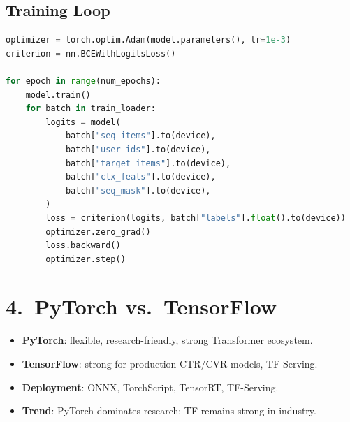 \documentclass[12pt]{article}
\begin{document}
\subsection*{Training Loop}
\begin{lstlisting}[language=Python]
optimizer = torch.optim.Adam(model.parameters(), lr=1e-3)
criterion = nn.BCEWithLogitsLoss()

for epoch in range(num_epochs):
    model.train()
    for batch in train_loader:
        logits = model(
            batch["seq_items"].to(device),
            batch["user_ids"].to(device),
            batch["target_items"].to(device),
            batch["ctx_feats"].to(device),
            batch["seq_mask"].to(device),
        )
        loss = criterion(logits, batch["labels"].float().to(device))
        optimizer.zero_grad()
        loss.backward()
        optimizer.step()
\end{lstlisting}

\section{4.\ PyTorch vs.\ TensorFlow}
\begin{itemize}
    \item \textbf{PyTorch}: flexible, research-friendly, strong Transformer ecosystem.
    \item \textbf{TensorFlow}: strong for production CTR/CVR models, TF-Serving.
    \item \textbf{Deployment}: ONNX, TorchScript, TensorRT, TF-Serving.
    \item \textbf{Trend}: PyTorch dominates research; TF remains strong in industry.
\end{itemize}
\end{document}
